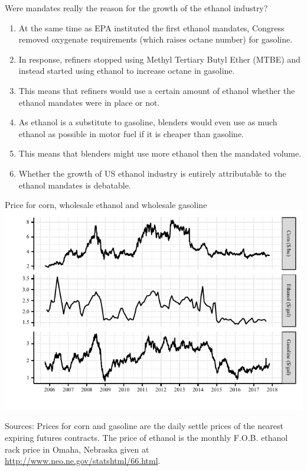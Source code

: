 \documentclass[table,xcolor=pdftex,dvipsnames]{beamer}\usepackage[]{graphicx}\usepackage[]{color}
\makeatletter
\def\maxwidth{ %
  \ifdim\Gin@nat@width>\linewidth
    \linewidth
  \else
    \Gin@nat@width
  \fi
}
\newenvironment{knitrout}{}{} %
\makeatother
\begin{document}

\begin{frame}{Were mandates really the reason for the growth of the ethanol industry?}
\begin{enumerate}[label=\textbullet]
    \item At the same time as EPA instituted the first ethanol mandates, Congress removed oxygenate requirements (which raises octane number) for gasoline.
    \item In response, refiners stopped using Methyl Tertiary Butyl Ether (MTBE) and instead started using ethanol to increase octane in gasoline.
    \item This means that refiners would use a certain amount of ethanol whether the ethanol mandates were in place or not.
    \item As ethanol is a substitute to gasoline, blenders would even use as much ethanol as possible in motor fuel if it is cheaper than gasoline.
    \item This means that blenders might use more ethanol then the mandated volume.
    \item Whether the growth of US ethanol industry is entirely attributable to the ethanol mandates is debatable.
\end{enumerate}
\end{frame}





\begin{frame}{Price for corn, wholesale ethanol and wholesale gasoline}
\begin{knitrout}
\color{fgcolor}
\includegraphics[width=\maxwidth]{figure/figure_price-1} 

\end{knitrout}
\vspace{-1\baselineskip}
\scriptsize
Sources: Prices for corn and gasoline are the daily settle prices of the nearest expiring futures contracts. The price of ethanol is the monthly F.O.B. ethanol rack price in Omaha, Nebraska given at \url{http://www.neo.ne.gov/statshtml/66.html}.
\end{frame}
\end{document}
